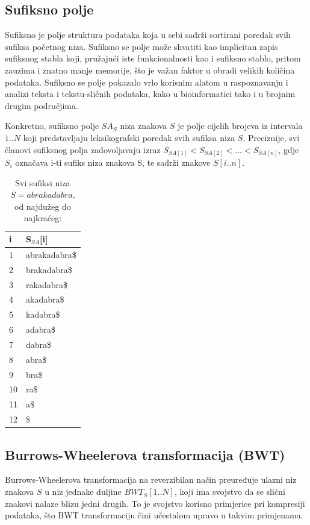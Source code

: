 \documentclass[a4paper,12pt]{article}
\begin{document}
\subsection{Sufiksno polje}

Sufiksno je polje struktura podataka koja u sebi sadrži sortirani poredak svih sufiksa početnog niza. Sufiksno se polje može shvatiti kao implicitan zapis sufiksnog stabla koji, pružajući iste funkcionalnosti kao i sufiksno stablo, pritom zauzima i znatno manje memorije, što je važan faktor u obradi velikih količina podataka. Sufiksno se polje pokazalo vrlo korisnim alatom u raspoznavanju i analizi teksta i tekstu-sličnih podataka, kako u bioinformatici tako i u brojnim drugim područjima.

Konkretno, sufiksno polje $SA_S$ niza znakova $S$ je polje cijelih brojeva iz intervala $1..N$ koji predstavljaju leksikografski poredak svih sufiksa niza $S$. Preciznije, svi članovi sufiksnog polja zadovoljavaju izraz $ S_{SA[1]} < S_{SA[2]} < ... < S_{SA[n]}$, gdje $ S_i $ označava i-ti sufiks niza znakova S, te sadrži znakove $S[i..n]$.

\begin{table}[h!]
	\caption{Svi sufiksi niza $S = abrakadabra$, od najdužeg do najkraćeg:}
	\label{tablePrimjer1}
	\begin{center}
		\begin{tabular}{ll}
			\toprule
			i & S$_{SA}$[i] \\
			\midrule
			1 & abrakadabra\$ \\
			2 & brakadabra\$ \\
			3 & rakadabra\$ \\
			4 & akadabra\$ \\
			5 & kadabra\$ \\
			6 & adabra\$ \\
			7 & dabra\$ \\
			8 & abra\$ \\
			9 & bra\$ \\
			10 & ra\$ \\
			11 & a\$ \\
			12 & \$ \\
			\bottomrule
		\end{tabular}
	\end{center}
\end{table}

\subsection{Burrows-Wheelerova transformacija (BWT)}
Burrows-Wheelerova transformacija na reverzibilan način preuređuje ulazni niz znakova $S$ u niz jednake duljine $BWT_S[1..N]$, koji ima svojstvo da se slični znakovi nalaze blizu jedni drugih. To je svojstvo korisno primjerice pri kompresiji podataka, što BWT transformaciju čini učestalom upravo u takvim primjenama.
\end{document}

